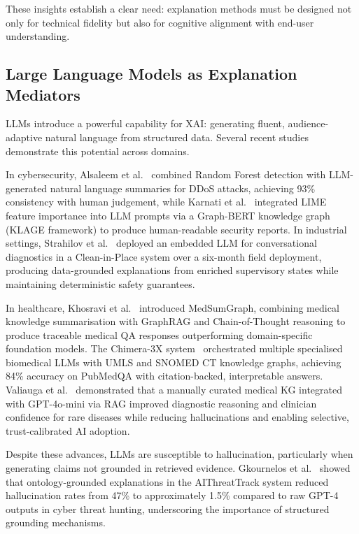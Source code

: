 \documentclass[lnbip]{svmultln}
\begin{document}
These insights establish a clear need: explanation methods must be designed not only for technical fidelity but also for cognitive alignment with end-user understanding.

\subsection{Large Language Models as Explanation Mediators}

LLMs introduce a powerful capability for XAI: generating fluent, audience-adaptive natural language from structured data. Several recent studies demonstrate this potential across domains.

In cybersecurity, Alsaleem et al.~\cite{ddos2025} combined Random Forest detection with LLM-generated natural language summaries for DDoS attacks, achieving 93\% consistency with human judgement, while Karnati et al.~\cite{klage2026} integrated LIME feature importance into LLM prompts via a Graph-BERT knowledge graph (KLAGE framework) to produce human-readable security reports. In industrial settings, Strahilov et al.~\cite{cip2026} deployed an embedded LLM for conversational diagnostics in a Clean-in-Place system over a six-month field deployment, producing data-grounded explanations from enriched supervisory states while maintaining deterministic safety guarantees.

In healthcare, Khosravi et al.~\cite{medsum2026} introduced MedSumGraph, combining medical knowledge summarisation with GraphRAG and Chain-of-Thought reasoning to produce traceable medical QA responses outperforming domain-specific foundation models. The Chimera-3X system~\cite{chimera2025} orchestrated multiple specialised biomedical LLMs with UMLS and SNOMED CT knowledge graphs, achieving 84\% accuracy on PubMedQA with citation-backed, interpretable answers. Valiauga et al.~\cite{racds2026} demonstrated that a manually curated medical KG integrated with GPT-4o-mini via RAG improved diagnostic reasoning and clinician confidence for rare diseases while reducing hallucinations and enabling selective, trust-calibrated AI adoption.

Despite these advances, LLMs are susceptible to hallucination, particularly when generating claims not grounded in retrieved evidence. Gkournelos et al.~\cite{threat2025} showed that ontology-grounded explanations in the AIThreatTrack system reduced hallucination rates from 47\% to approximately 1.5\% compared to raw GPT-4 outputs in cyber threat hunting, underscoring the importance of structured grounding mechanisms.
\end{document}

